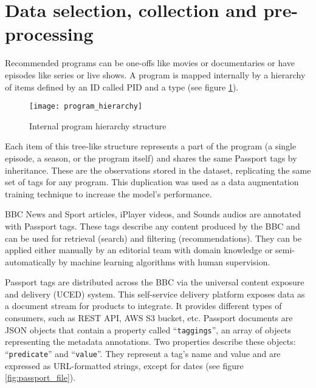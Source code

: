 
\section{Data selection, collection and pre-processing}


Recommended programs can be one-offs like movies or documentaries or have episodes like series or live shows.
A program is mapped internally by a hierarchy of items defined by an ID called PID and a type (see figure \ref{fig:program_hierarchy}).

\begin{figure}[h]
  \centering
  \texttt{[image: program\_hierarchy]}
  \caption{Internal program hierarchy structure}
  \label{fig:program_hierarchy}
\end{figure}

Each item of this tree-like structure represents a part of the program
(a single episode, a season, or the program itself) and shares the same Passport tags by inheritance.
These are the observations stored in the dataset, replicating the same set of tags for any program.
This duplication was used as a data augmentation training technique to increase the model's performance.

BBC News and Sport articles, iPlayer videos, and Sounds audios are annotated with Passport tags.
These tags describe any content produced by the BBC and can be used for retrieval (search) and filtering (recommendations).
They can be applied either manually by an editorial team with domain knowledge
or semi-automatically by machine learning algorithms with human supervision.

Passport tags are distributed across the BBC via the universal content exposure and delivery (UCED) system.
This self-service delivery platform exposes data as a document stream for products to integrate.
It provides different types of consumers, such as REST API, AWS S3 bucket, etc.
Passport documents are JSON objects that contain a property called ``\verb|taggings|'', an array of objects representing the
metadata annotations. Two properties describe these objects: ``\verb|predicate|'' and ``\verb|value|''.
They represent a tag's name and value and are expressed as URL-formatted strings, except for dates (see figure \ref{fig:passport_file}).

